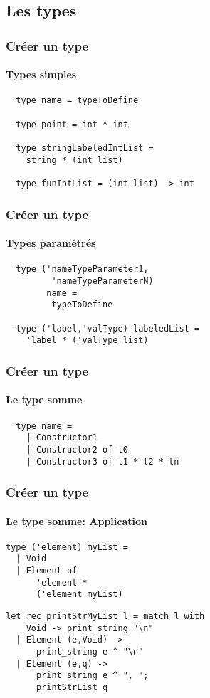 \subsection{Les types} %
\begin{frame}[fragile]
	\frametitle{Créer un type}
	\framesubtitle{Types simples}
	\begin{lstlisting}
  type name = typeToDefine

  type point = int * int

  type stringLabeledIntList = 
    string * (int list)

  type funIntList = (int list) -> int
	\end{lstlisting}
\end{frame}

\begin{frame}[fragile]
	\frametitle{Créer un type}
	\framesubtitle{Types paramétrés}
	\begin{lstlisting}
  type ('nameTypeParameter1,
 	     'nameTypeParameterN) 
   	    name = 
         typeToDefine
    
  type ('label,'valType) labeledList =
    'label * ('valType list) 
	\end{lstlisting}
\end{frame}


\begin{frame}[fragile]
	\frametitle{Créer un type}
	\framesubtitle{Le type somme}
	\begin{lstlisting}
  type name =
    | Constructor1 
    | Constructor2 of t0 
    | Constructor3 of t1 * t2 * tn 
	\end{lstlisting}
\end{frame}

\begin{frame}[fragile]
	\frametitle{Créer un type}
	\framesubtitle{Le type somme: Application}
			\begin{lstlisting}
type ('element) myList =
  | Void
  | Element of 
      'element * 
      ('element myList)
			\end{lstlisting}

			\begin{lstlisting}
let rec printStrMyList l = match l with
    Void -> print_string "\n"
  | Element (e,Void) -> 
      print_string e ^ "\n"
  | Element (e,q) -> 
      print_string e ^ ", ";
      printStrList q
			\end{lstlisting}
\end{frame}

